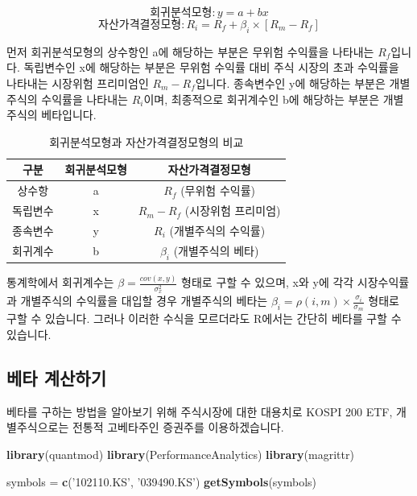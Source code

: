 \documentclass[12pt,]{book}
\newenvironment{Shaded}{\begin{snugshade}}{\end{snugshade}}
\newcommand{\KeywordTok}[1]{\textcolor[rgb]{0.13,0.29,0.53}{\textbf{#1}}}
\newcommand{\NormalTok}[1]{#1}
\newcommand{\StringTok}[1]{\textcolor[rgb]{0.31,0.60,0.02}{#1}}
\begin{document}
\[회귀분석모형: y = a + bx\]
\[자산가격결정모형: R_i = R_f + \beta_i\times[R_m - R_f]\]

먼저 회귀분석모형의 상수항인 a에 해당하는 부분은 무위험 수익률을 나타내는 \(R_f\)입니다. 독립변수인 x에 해당하는 부분은 무위험 수익률 대비 주식 시장의 초과 수익률을 나타내는 시장위험 프리미엄인 \(R_m - R_f\)입니다. 종속변수인 y에 해당하는 부분은 개별주식의 수익률을 나타내는 \(R_i\)이며, 최종적으로 회귀계수인 b에 해당하는 부분은 개별 주식의 베타입니다.

\begin{table}[!h]

\caption{\label{tab:unnamed-chunk-5}회귀분석모형과 자산가격결정모형의 비교}
\centering
\begin{tabular}{ccc}
\toprule
구분 & 회귀분석모형 & 자산가격결정모형\\
\midrule
\rowcolor{gray!6}  상수항 & a & $R_f$ (무위험 수익률)\\
독립변수 & x & $R_m - R_f$ (시장위험 프리미엄)\\
\rowcolor{gray!6}  종속변수 & y & $R_i$ (개별주식의 수익률)\\
회귀계수 & b & $\beta_i$ (개별주식의 베타)\\
\bottomrule
\end{tabular}
\end{table}

통계학에서 회귀계수는 \(\beta = \frac{cov(x,y)}{\sigma_x^2}\) 형태로 구할 수 있으며, x와 y에 각각 시장수익률과 개별주식의 수익률을 대입할 경우 개별주식의 베타는 \(\beta_i= \rho(i,m) \times\frac{\sigma_i}{\sigma_m}\) 형태로 구할 수 있습니다. 그러나 이러한 수식을 모르더라도 R에서는 간단히 베타를 구할 수 있습니다.

\hypertarget{section-47}{%
\subsection{베타 계산하기}\label{section-47}}

베타를 구하는 방법을 알아보기 위해 주식시장에 대한 대용치로 KOSPI 200 ETF, 개별주식으로는 전통적 고베타주인 증권주를 이용하겠습니다.

\begin{Shaded}
\begin{Highlighting}[]
\KeywordTok{library}\NormalTok{(quantmod)}
\KeywordTok{library}\NormalTok{(PerformanceAnalytics)}
\KeywordTok{library}\NormalTok{(magrittr)}

\NormalTok{symbols =}\StringTok{ }\KeywordTok{c}\NormalTok{(}\StringTok{'102110.KS'}\NormalTok{, }\StringTok{'039490.KS'}\NormalTok{)}
\KeywordTok{getSymbols}\NormalTok{(symbols)}
\end{Highlighting}
\end{Shaded}
\end{document}
